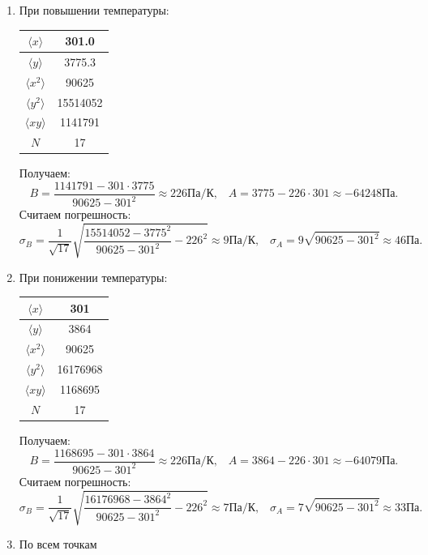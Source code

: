 \documentclass[a4paper,12pt]{article} %
\begin{document}
\begin{enumerate}
\item При повышении температуры:
\begin{center}
\begin{tabular}{|c|c|}
\hline 
$\langle x \rangle$ & 301.0 \\ 
\hline 
$\langle y \rangle$ & 3775.3 \\ 
\hline 
$\langle x^2 \rangle$ & 90625 \\ 
\hline 
$\langle y^2 \rangle$ & 15514052 \\ 
\hline 
$\langle xy \rangle$ & 1141791 \\ 
\hline 
$N$ & 17 \\ 
\hline 
\end{tabular} 
\end{center}

Получаем:
\[
B = \frac{1141791 - 301 \cdot 3775}{90625 - 301^2} \approx 226 \text{Па/К}, \;\;\;
A = 3775 - 226 \cdot 301 \approx -64248 \text{Па}.
\]
Считаем погрешность:
\[
\sigma_B = \frac{1}{\sqrt{17}} \sqrt{\frac{15514052 - 3775^2}{90625 - 301^2} - 226^2} \approx 9 \text{Па/К}, \;\;\; \sigma_A = 9 \sqrt{90625 - 301^2} \approx 46 \text{Па}.
\]

\item При понижении температуры:

\begin{center}
\begin{tabular}{|c|c|}
\hline 
$\langle x \rangle$ & 301 \\ 
\hline 
$\langle y \rangle$ & 3864 \\ 
\hline 
$\langle x^2 \rangle$ & 90625 \\ 
\hline 
$\langle y^2 \rangle$ & 16176968 \\ 
\hline 
$\langle xy \rangle$ & 1168695 \\ 
\hline 
$N$ & 17 \\ 
\hline 
\end{tabular} 
\end{center}

Получаем:
\[
B = \frac{1168695 - 301 \cdot 3864}{90625 - 301^2} \approx 226 \text{Па/К}, \;\;\;
A = 3864 - 226 \cdot 301 \approx -64079 \text{Па}.
\]
Считаем погрешность:
\[
\sigma_B = \frac{1}{\sqrt{17}} \sqrt{\frac{16176968 - 3864^2}{90625 - 301^2} - 226^2} \approx 7 \text{Па/К}, \;\;\; \sigma_A = 7 \sqrt{90625 - 301^2} \approx 33 \text{Па}.
\]

\item По всем точкам


\end{enumerate}
\end{document}
